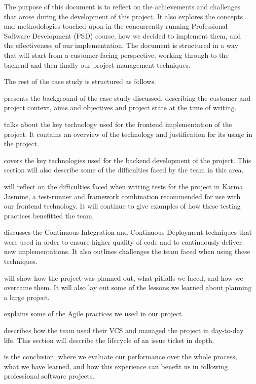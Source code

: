 \documentclass{l3proj}
\begin{document}
The purpose of this document is to reflect on the achievements and challenges
 that arose during the development of this project. It also explores the concepts
 and methodologies touched upon in the concurrently running Professional Software
 Development (PSD) course, how we decided to implement them, and the effectiveness
 of our implementation. The document is structured in a way that will start from
 a customer-facing perspective, working through to the backend and then finally
 our project management techniques.

The rest of the case study is structured as follows.

 presents the background of the case study
 discussed, describing the customer and project context, aims and
 objectives and project state at the time of writing.

 talks about the key technology used for the
 frontend implementation of the project. It contains an overview of the
 technology and justification for its usage in the project.

 covers the key technologies used for the
 backend development of the project. This section will also describe
 some of the difficulties faced by the team in this area.

 will reflect on the difficulties faced when
 writing tests for the project in Karma Jasmine, a test-runner and framework
 combination recommended for use with our frontend technology. It will continue
 to give examples of how these testing practices benefitted the team.

 discusses the Continuous Integration and Continuous
 Deployment techniques that were used in order to ensure higher quality
 of code and to continuously deliver new implementations. It also outlines
 challenges the team faced when using these techniques.

 will show how the project was planned out,
 what pitfalls we faced, and how we overcame them. It will also lay out
 some of the lessons we learned about planning a large project.

 explains some of the Agile practices we used in our 
 project.

 describes how the team used their VCS and managed the 
 project in day-to-day life. This section will describe the lifecycle of an issue ticket in
 depth.

 is the conclusion, where we evaluate our 
 performance over the whole process, what we have learned, and how 
 this experience can benefit us in following professional software projects.
\end{document}
